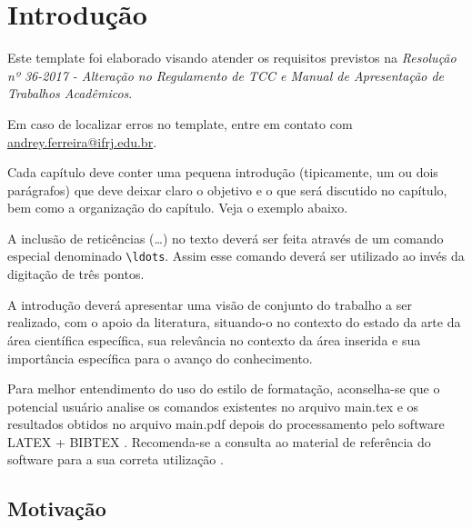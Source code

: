 %
%

\chapter{Introdução}\label{chap:introducao}

Este template foi elaborado visando atender os requisitos previstos na \textit{Resolução nº 36-2017 - Alteração no Regulamento de TCC e Manual de Apresentação de Trabalhos Acadêmicos}.

Em caso de localizar erros no template, entre em contato com \url{andrey.ferreira@ifrj.edu.br}.


Cada capítulo deve conter uma pequena introdução (tipicamente, um ou dois parágrafos) que deve deixar claro o objetivo e o que será discutido no capítulo, bem como a organização do capítulo.
Veja o exemplo abaixo.

A inclusão de reticências (\ldots) no texto deverá ser feita através de um comando especial denominado \verb|\ldots|.
Assim esse comando deverá ser utilizado ao invés da digitação de três pontos.

A introdução deverá apresentar uma visão de conjunto do trabalho a ser realizado, com o apoio da literatura, situando-o no contexto do estado da arte da área científica específica, sua relevância no contexto da área inserida e sua importância específica para o avanço do conhecimento.

Para melhor entendimento do uso do estilo de formatação, aconselha-se que o potencial usuário analise os comandos existentes no arquivo {\ttfamily main.tex} e os resultados obtidos no arquivo {\ttfamily main.pdf} depois do processamento pelo software LATEX + BIBTEX \cite{LaTeX2009,BibTeX2009}.
Recomenda-se a consulta ao material de referência do software para a sua correta utilização \cite{Lamport1986,Buerger1989,Kopka2003,Mittelbach2004}.

\section{Motivação}
\label{sec:motivacao}

